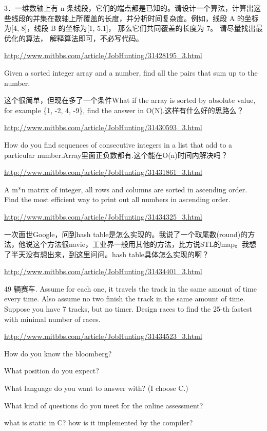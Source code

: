 \documentclass[12pt]{book}
\begin{document}
3．一维数轴上有 n 条线段，它们的端点都是已知的。请设计一个算法，计算出这些线段的并集在数轴上所覆盖的长度，并分析时间复杂度。例如，线段 A 的坐标为[4, 8]，线段 B 的坐标为[1, 5.1]， 那么它们共同覆盖的长度为 7。 请尽量找出最优化的算法， 解释算法即可，不必写代码。

\url{http://www.mitbbs.com/article/JobHunting/31428195_3.html}

Given a sorted integer array and a number, find all the pairs that sum
up to the number.

这个很简单，但现在多了一个条件What if the array is sorted by absolute value, for example \{1, -2, 4, -9\}, find the answer in O(N).这样有什么好的思路么？

\url{http://www.mitbbs.com/article/JobHunting/31430593_3.html}

How do you find sequences of consecutive integers in a list that add to a particular number.Array里面正负数都有.这个能在O(n)时间内解决吗？

\url{http://www.mitbbs.com/article/JobHunting/31431861_3.html}

A m*n matrix of integer, all rows and columns are sorted in ascending
order. Find the most efficient way to print out all numbers in
ascending order. 

\url{http://www.mitbbs.com/article/JobHunting/31434325_3.html}

一次面世Google，问到hash table是怎么实现的。我说了一个取尾数(round)的方法，他说这个方法很navie，工业界一般用其他的方法，比方说STL的map。我想了半天没有想出来，到这里问问。hash table具体怎么实现的啊？

\url{http://www.mitbbs.com/article/JobHunting/31434401_3.html}

49 辆赛车. Assume for each one, it travels the track in the same amount of time every time. Also assume no two finish the track in the same amount of time. Suppose you have 7 tracks, but no timer. Design races to find the 25-th fastest with minimal number of races.

\url{http://www.mitbbs.com/article/JobHunting/31434523_3.html}

How do you know the bloomberg? 

What position do you expect? 

What language do you want to answer with? (I choose C.) 

What kind of questions do you meet for the online assessment?

what is static in C? how is it implemented by the compiler?
\end{document}
